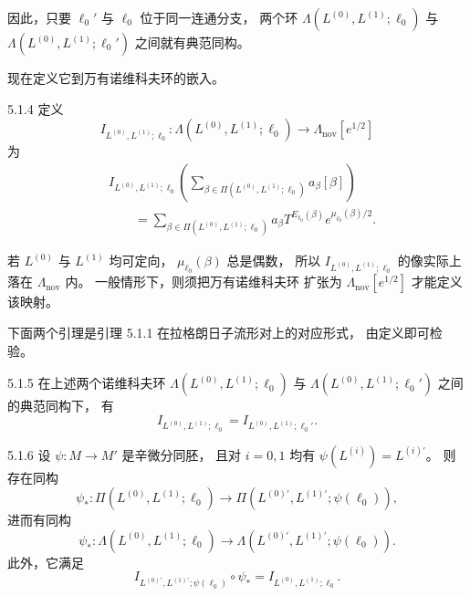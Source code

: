 因此，只要 $\ell_0'$ 与 $\ell_0$
位于同一连通分支，
两个环
$\Lambda(L^{(0)},L^{(1)};\ell_0)$
与
$\Lambda(L^{(0)},L^{(1)};\ell_0')$
之间就有典范同构。

现在定义它到万有诺维科夫环的嵌入。
\begin{definition}{5.1.4}\label{def:5-1-4}
定义
\[
I_{L^{(0)},L^{(1)};\ell_0}:
\Lambda(L^{(0)},L^{(1)};\ell_0)
\longrightarrow
\Lambda_{\mathrm{nov}}[e^{1/2}]
\]
为
\[
\begin{aligned}
&I_{L^{(0)},L^{(1)};\ell_0}
\left(
\sum_{\beta\in\Pi(L^{(0)},L^{(1)};\ell_0)}
a_\beta[\beta]\right)\\
&\qquad=
\sum_{\beta\in\Pi(L^{(0)},L^{(1)};\ell_0)}
a_\beta T^{E_{\ell_0}(\beta)}
e^{\mu_{\ell_0}(\beta)/2}.
\end{aligned}
\]
\end{definition}

若 $L^{(0)}$ 与 $L^{(1)}$ 均可定向，
$\mu_{\ell_0}(\beta)$ 总是偶数，
所以 $I_{L^{(0)},L^{(1)};\ell_0}$
的像实际上落在 $\Lambda_{\mathrm{nov}}$ 内。
一般情形下，则须把万有诺维科夫环
扩张为 $\Lambda_{\mathrm{nov}}[e^{1/2}]$
才能定义该映射。

下面两个引理是引理 5.1.1
在拉格朗日子流形对上的对应形式，
由定义即可检验。

\begin{lemma}{5.1.5}\label{lem:5-1-5}
在上述两个诺维科夫环
$\Lambda(L^{(0)},L^{(1)};\ell_0)$
与
$\Lambda(L^{(0)},L^{(1)};\ell_0')$
之间的典范同构下，
有
\[
I_{L^{(0)},L^{(1)};\ell_0}
=I_{L^{(0)},L^{(1)};\ell_0'}.
\]
\end{lemma}

\begin{lemma}{5.1.6}\label{lem:5-1-6}
设 $\psi:M\to M'$ 是辛微分同胚，
且对 $i=0,1$ 均有
$\psi(L^{(i)})=L^{(i)\prime}$。
则存在同构
\[
\psi_*:\Pi(L^{(0)},L^{(1)};\ell_0)
\longrightarrow
\Pi(L^{(0)\prime},L^{(1)\prime};\psi(\ell_0)),
\]
进而有同构
\[
\psi_*:\Lambda(L^{(0)},L^{(1)};\ell_0)
\longrightarrow
\Lambda(L^{(0)\prime},L^{(1)\prime};\psi(\ell_0)).
\]
此外，它满足
\[
I_{L^{(0)\prime},L^{(1)\prime};\psi(\ell_0)}
\circ\psi_*
=I_{L^{(0)},L^{(1)};\ell_0}.
\]
\end{lemma}
